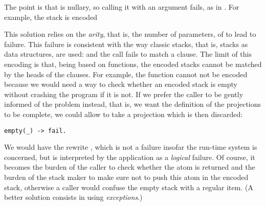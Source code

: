 The point is that  is nullary, so calling it with an
argument fails, as in . For
example, the stack \erlcode{[a,b,c]} is encoded
\begin{center}
\end{center}
This solution relies on the \emph{arity}, that is, the number of
parameters, of  to lead to failure. This failure is
consistent with the way classic stacks, that is, stacks as data
structures, are used:  and the call
 fails to match a clause. The limit of this encoding
is that, being based on functions, the encoded stacks cannot be
matched by the heads of the clauses. For example, the function
  
cannot not be encoded because we would need a way to check whether an
encoded stack is empty without crashing the program if it is not. If
we prefer the caller to be gently informed of the problem instead,
that is, we want the definition of the projections to be complete, we
could allow  to take a projection which is then
discarded:
\begin{verbatim}
empty(_) -> fail.
\end{verbatim}
We would have the rewrite , which is not a failure insofar the run\hyp{}time system is
concerned, but is interpreted by the application as a \emph{logical}
failure. Of course, it becomes the burden of the caller to check
whether the atom  is returned and the burden of the
stack maker to make sure not to push this atom in the encoded stack,
otherwise a caller would confuse the empty stack with a regular
item. (A better solution consists in using \emph{exceptions}.)


